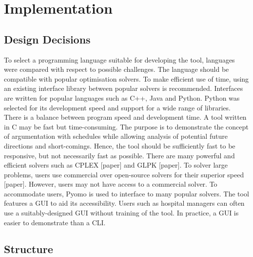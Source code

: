 \chapter{Implementation}

\section{Design Decisions}

To select a programming language suitable for developing the tool, languages were compared with respect to possible challenges. The language should be compatible with popular optimisation solvers. To make efficient use of time, using an existing interface library between popular solvers is recommended. Interfaces are written for popular languages such as C++, Java and Python. Python was selected for its development speed and support for a wide range of libraries.
\linespace
There is a balance between program speed and development time. A tool written in C may be fast but time-consuming. The purpose is to demonstrate the concept of argumentation with schedules while allowing analysis of potential future directions and short-comings. Hence, the tool should be sufficiently fast to be responsive, but not necessarily fast as possible.
\linespace
There are many powerful and efficient solvers such as CPLEX [paper] and GLPK [paper]. To solver large problems, users use commercial over open-source solvers for their superior speed [paper]. However, users may not have access to a commercial solver. To accommodate users, Pyomo is used to interface to many popular solvers.
\linespace
The tool features a GUI to aid its accessibility. Users such as hospital managers can often use a suitably-designed GUI without training of the tool. In practice, a GUI is easier to demonstrate than a CLI.

\section{Structure}

